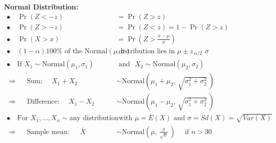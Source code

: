 \documentclass[12pt]{article}
\begin{document}
{\bf Normal Distribution:}\\[-0.8cm]
\begin{align*}
\bullet\quad \Pr(Z < -z) &= \Pr(Z > z) \\[0.6cm]
\bullet\quad \Pr(Z > -z) &= \Pr(Z < z) = 1 -\Pr(Z>z) \\[0.6cm]
\bullet\quad \Pr(X > x) &= \Pr\left(Z> \frac{x-\mu}{\sigma}\right)\\[0.6cm]
\bullet\quad (1-\alpha)100\% \text{ of the Normal}(\mu,\sigma) & \text{ distribution lies in } \mu \pm z_{\,\alpha/2}\,\,\sigma \\[1cm]
\bullet\quad \text{If} \,\,  X_1 \sim \text{Normal}(\mu_1,\sigma_1) \,\,  & \text{ and } \,\, X_2 \sim \text{Normal}(\mu_2,\sigma_2) \\[0.4cm]
\Rightarrow \quad  \text{ Sum: } \quad  X_1 + X_2 &\sim \text{Normal}\left(\mu_1+\mu_2,\,\sqrt{\sigma_1^2+\sigma_2^2}\,\right) \\[0.4cm]
\Rightarrow \quad  \text{ Difference: } \quad   X_1 - X_2 &\sim \text{Normal}\left(\mu_1-\mu_2,\,\sqrt{\sigma_1^2+\sigma_2^2}\,\right) \\[1cm]
\bullet\quad \text{For} \,\,  X_1,\ldots,X_n \sim \text{any distribution} & \text{ with } \mu = E(X) \text{ and } \sigma = Sd(X) = \sqrt{Var(X)}\\[0.4cm]
\Rightarrow \quad  \text{ Sample mean: } \quad  \,\overline{\!X} &\sim \text{Normal}\left(\mu,\,\frac{\sigma}{\sqrt{n}}\,\right) \quad \text{ if } n > 30
\end{align*}

\newpage
\end{document}
